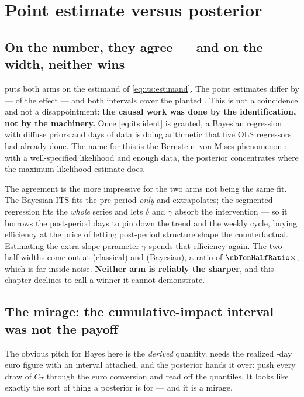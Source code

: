 \section{Point estimate versus posterior}
\label{sec:its:compare}



\subsection*{On the number, they agree --- and on the width, neither wins}

 puts both arms on the estimand of \cref{eq:its:estimand}. The point
estimates differ by \pp{\nbTenEstDiff} --- \pc{\nbTenEstDiffPct} of the effect --- and both
intervals cover the planted \pp{+\nbTenTrueLift}. This is not a coincidence and not a
disappointment: \textbf{the causal work was done by the identification, not by the machinery.}
Once \cref{eq:its:ident} is granted, a Bayesian regression with diffuse priors and \nbTenNPre{}
days of data is doing arithmetic that five OLS regressors had already done. The name for this is
the Bernstein--von Mises phenomenon \citep{gelman2013}: with a well-specified likelihood and enough
data, the posterior concentrates where the maximum-likelihood estimate does.

The agreement is the more impressive for the two arms not being the same fit. The Bayesian ITS fits
the pre-period \emph{only} and extrapolates; the segmented regression fits the \emph{whole} series
and lets $\delta$ and $\gamma$ absorb the intervention --- so it borrows the post-period days to
pin down the trend and the weekly cycle, buying efficiency at the price of letting post-period
structure shape the counterfactual. Estimating the extra slope parameter $\gamma$ spends that
efficiency again. The two half-widths come out at \pp{\nbTenClHalf} (classical) and
\pp{\nbTenBayesHalf} (Bayesian), a ratio of $\nbTenHalfRatio\times$, which is far inside noise.
\textbf{Neither arm is reliably the sharper}, and this chapter declines to call a winner it cannot
demonstrate.

\subsection*{The mirage: the cumulative-impact interval was not the payoff}

The obvious pitch for Bayes here is the \emph{derived} quantity.  needs the
realized \nbTenNPost-day euro figure with an interval attached, and the posterior hands it over: push every
draw of $C_T$ through the euro conversion and read off the quantiles. It looks like exactly the
sort of thing a posterior is for --- and it is a mirage.

